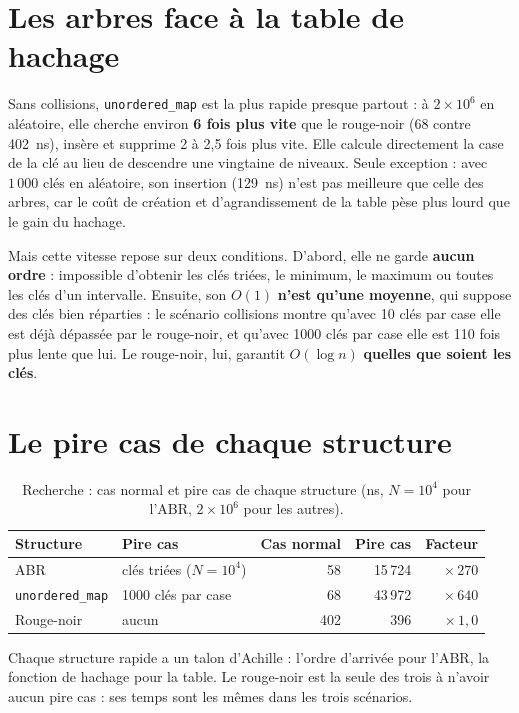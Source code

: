 \documentclass[12pt,a4paper]{report}
\newcommand{\bad}{\cellcolor{ko}}
\begin{document}
\section{Les arbres face à la table de hachage}
Sans collisions, \texttt{unordered\_map} est la plus rapide presque partout : à $2\times10^6$ en aléatoire, elle cherche environ \textbf{6 fois plus vite} que le rouge-noir (68 contre 402~ns), insère et supprime 2 à 2,5 fois plus vite. Elle calcule directement la case de la clé au lieu de descendre une vingtaine de niveaux. Seule exception : avec $1\,000$ clés en aléatoire, son insertion (129~ns) n'est pas meilleure que celle des arbres, car le coût de création et d'agrandissement de la table pèse plus lourd que le gain du hachage.

Mais cette vitesse repose sur deux conditions. D'abord, elle ne garde \textbf{aucun ordre} : impossible d'obtenir les clés triées, le minimum, le maximum ou toutes les clés d'un intervalle. Ensuite, son $O(1)$ \textbf{n'est qu'une moyenne}, qui suppose des clés bien réparties : le scénario collisions montre qu'avec 10 clés par case elle est déjà dépassée par le rouge-noir, et qu'avec 1000 clés par case elle est 110 fois plus lente que lui. Le rouge-noir, lui, garantit $O(\log n)$ \textbf{quelles que soient les clés}.

\section{Le pire cas de chaque structure}
\begin{table}[H]
\centering
\caption{Recherche : cas normal et pire cas de chaque structure (ns, $N = 10^4$ pour l'ABR, $2\times10^6$ pour les autres).}
\small
\begin{tabular}{llrrr}
  \toprule
  Structure & Pire cas & Cas normal & Pire cas & Facteur \\
  \midrule
  ABR & clés triées ($N = 10^4$) & 58 & \bad 15\,724 & $\times\,270$ \\
  \texttt{unordered\_map} & 1000 clés par case & 68 & \bad 43\,972 & $\times\,640$ \\
  Rouge-noir & aucun & 402 & 396 & $\times\,1{,}0$ \\
  \bottomrule
\end{tabular}
\end{table}
Chaque structure rapide a un talon d'Achille : l'ordre d'arrivée pour l'ABR, la fonction de hachage pour la table. Le rouge-noir est la seule des trois à n'avoir aucun pire cas : ses temps sont les mêmes dans les trois scénarios.
\end{document}

